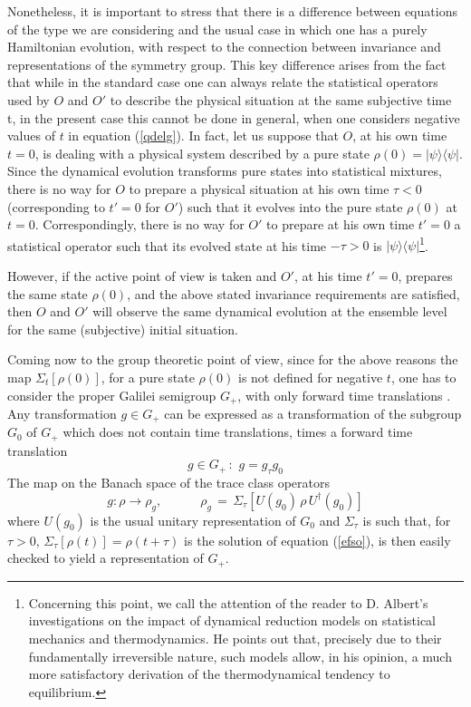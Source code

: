 \documentclass[10pt,a4paper]{article}
\begin{document}
Nonetheless, it is important to stress that there is a difference
between equations of the type we are considering and the usual
case in which one has a purely Hamiltonian evolution, with respect
to the connection between invariance and representations of the
symmetry group. This key difference arises from the fact that
while in the standard case one can always relate the statistical
operators used by $O$ and $O'$ to describe the physical situation
at the same subjective time t, in the present case this cannot be
done in general, when one considers negative values of $t$ in
equation (\ref{qdelg}). In fact, let us suppose that $O$, at his
own time $t = 0$, is dealing with a physical system described by a
pure state $\rho(0) = |\psi\rangle \langle\psi|$. Since the
dynamical evolution transforms pure states into statistical
mixtures, there is no way for $O$ to prepare a physical situation
at his own time $\tau < 0$ (corresponding to $t'=0$ for $O'$) such
that it evolves into the pure state $\rho(0)$ at $t = 0$.
Correspondingly, there is no way for $O'$ to prepare at his own
time $t' = 0$ a statistical operator such that its evolved state
at his time $- \tau > 0$ is $|\psi\rangle
\langle\psi|$\footnote{Concerning this point, we call the
attention of the reader to D. Albert's investigations \cite{alrd2}
on the impact of dynamical reduction models on statistical
mechanics and thermodynamics. He points out that, precisely due to
their fundamentally irreversible nature, such models allow, in his
opinion, a much more satisfactory derivation of the thermodynamical
tendency to equilibrium.}.

However, if the active point of view is taken and $O'$, at his
time $t' = 0$, prepares the same state $\rho(0)$, and the above
stated invariance requirements are satisfied, then $O$ and $O'$
will observe the same dynamical evolution at the ensemble level
for the same (subjective) initial situation.

Coming now to the group theoretic point of view, since for the
above reasons the map $\Sigma_{t}[\rho(0)]$, for a pure state
$\rho(0)$ is not defined for negative $t$, one has to consider the
proper Galilei semigroup $G_{+}$, with only forward time
translations \cite{grwctm}. Any transformation $g \in G_{+}$ can
be expressed as a transformation of the subgroup $G_{0}$ of
$G_{+}$ which does not contain time translations, times a forward
time translation
\begin{equation}
g \in G_{+}\,:\,\, g = g_{\tau}g_{0}
\end{equation}
The map on the Banach space of the trace class operators
\begin{equation}
g : \rho \longrightarrow \rho_{g}, \qquad\quad \rho_{g} \, = \,
\Sigma_{\tau}[U(g_{0})\, \rho\, U^{\dagger}(g_{0})]
\end{equation}
where $U(g_{0})$ is the usual unitary representation of $G_{0}$
and $\Sigma_{\tau}$ is such that, for $\tau > 0$,
$\Sigma_{\tau}[\rho(t)] = \rho(t+\tau)$ is the solution of
equation (\ref{efso}), is then easily checked to yield a
representation of $G_{+}$.
\end{document}
